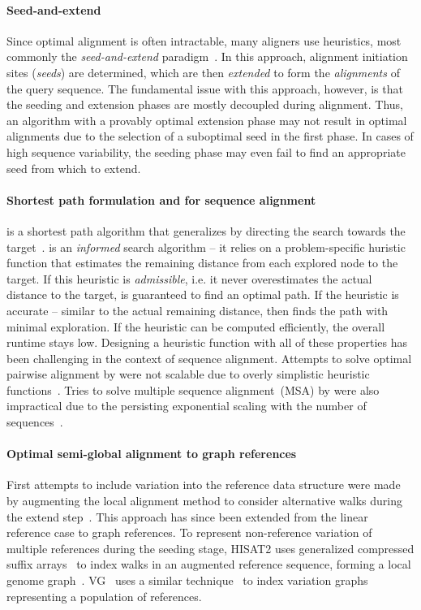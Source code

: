 \paragraph{Seed-and-extend}
Since optimal alignment is often intractable, many aligners use heuristics, most
commonly the \emph{seed-and-extend}
paradigm~\cite{altschul_basic_1990,langmead_fast_2012,li_fast_2009}. In this
approach, alignment initiation sites (\emph{seeds}) are determined, which are
then \emph{extended} to form the \emph{alignments} of the query sequence. The
fundamental issue with this approach, however, is that the seeding and extension
phases are mostly decoupled during alignment. Thus, an algorithm with a provably
optimal extension phase may not result in optimal alignments due to the
selection of a suboptimal seed in the first phase. In cases of high sequence
variability, the seeding phase may even fail to find an appropriate seed from
which to extend.

\paragraph{Shortest path formulation and \A for sequence alignment}
\A is a shortest path algorithm that generalizes \dijkstra by directing the
search towards the target~\citep{hart1968formal}. \A is an \emph{informed}
search algorithm -- it relies on a problem-specific huristic function that
estimates the remaining distance from each explored node to the target. If this
heuristic is \emph{admissible}, i.e. it never overestimates the actual distance
to the target, \A is guaranteed to find an optimal path. If the heuristic is
accurate -- similar to the actual remaining distance, then \A finds the path
with minimal exploration. If the heuristic can be computed efficiently, the
overall runtime stays low. Designing a heuristic function with all of these
properties has been challenging in the context of sequence alignment. Attempts
to solve optimal pairwise alignment by \A were not scalable due to overly
simplistic heuristic functions~\cite{dox2018efficient}. Tries to solve multiple
sequence alignment~(MSA) by \A were also impractical due to the persisting
exponential scaling with the number of
sequences~\citep{lermen2000practical,zhou2002multiple,mcnaughton2002memory}.

\paragraph{Optimal semi-global alignment to graph references}
First attempts to include variation into the reference data structure were made
by augmenting the local alignment method to consider alternative walks during
the extend step~\cite{schneeberger_simultaneous_2009,palmapper}. This approach
has since been extended from the linear reference case to graph references. To
represent non-reference variation of multiple references during the seeding
stage, HISAT2 uses generalized compressed suffix
arrays~\cite{siren_indexing_2014} to index walks in an augmented reference
sequence, forming a local genome graph~\cite{kim_graphbased_2019}.
VG~\cite{garrison_variation_2018} uses a similar
technique~\cite{siren_indexing_2017} to index variation graphs representing a
population of references.

